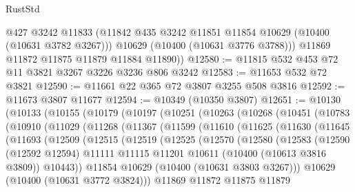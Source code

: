 \begin{lexlean}{RustStd}
\begin{coremodule}
{\begin{coremodule}
{{{{{{{{{{{{{{{{{{{{{{{{{          @427
          @3242
          @11833
          (@11842 @435 @3242 @11851 @11854 @10629 (@10400 (@10631 @3782 @3267)))
          @10629
          (@10400 (@10631 @3776 @3788)))
        @11869
        @11872
        @11875
        @11879
        @11884
        @11890))
@12580 := @11815 @532 @453 @72 @11 @3821 @3267 @3226 @3236 @806 @3242
@12583 := @11653 @532 @72 @3821
@12590 := @11661 @22 @365 @72 @3807 @3255 @508 @3816
@12592 := @11673 @3807 @11677
@12594 := @10349 (@10350 @3807)
@12651 := @10130
    (@10133
      (@10155
        (@10179
          (@10197
            (@10251
              (@10263
                (@10268
                  (@10451
                    (@10783
                      (@10910
                        (@11029
                          (@11268
                            (@11367
                              (@11599
                                (@11610
                                  (@11625
                                    (@11630
                                      (@11645
                                        (@11693
                                          (@12509
                                            (@12515
                                              (@12519
                                                (@12525
                                                  (@12570
                                                    (@12580
                                                      (@12583
                                                        (@12590
                                                          (@12592 @12594)
                                                          @11111
                                                          @11115
                                                          @11201
                                                          @10611
                                                          (@10400 (@10613 @3816 @3809))
                                                          @10443))
                                                      @11854
                                                      @10629
                                                      (@10400 (@10631 @3803 @3267)))
                                                    @10629
                                                    (@10400 (@10631 @3772 @3824)))
                                                  @11869
                                                  @11872
                                                  @11875
                                                  @11879
}}}}}}}}}}}}}}}}}}}}}}}}}
\end{coremodule}}
\end{coremodule}
\end{lexlean}

